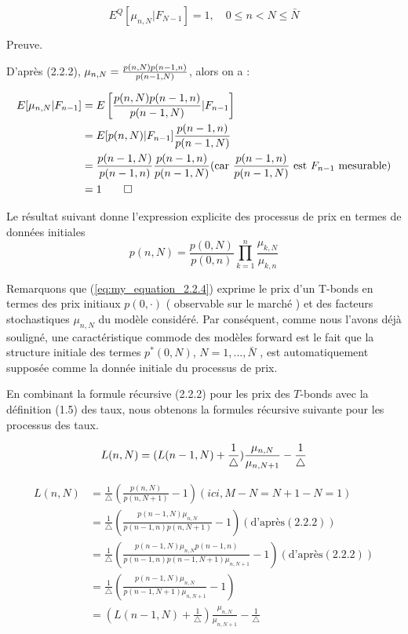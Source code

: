 \begin{equation}
    E^Q[\mu_{n,N}|F_{N-1}] = 1, \quad 0 \leq n < N \leq \bar{N}
    \label{eq:my_equation_2.2.3}
\end{equation}

Preuve.

D'après (2.2.2), $\mu_{n,N}={p(n,N)p(n-1,n) \over p(n-1,N)}$, alors on a :

\begin{align*}
    E[\mu_{n,N} | F_{n-1}] 
    & = E\left[\frac{p(n,N)p(n-1,n)}{p(n-1,N)} | F_{n-1}\right] \\
    & = E[p(n,N) | F_{n-1}] \frac{p(n-1,n)}{p(n-1,N)} \\
    & = \frac{p(n-1,N)}{p(n-1,n)} \frac{p(n-1,n)}{p(n-1,N)} \text{(car} \ {p(n-1,n) \over p(n-1,N)} \ \text{est} \ F_{n-1}\ \text{mesurable)}\\
    & = 1 \tag*{$\Box$}
\end{align*}



Le résultat suivant donne l'expression explicite des processus de prix en termes de données initiales
\begin{equation}
    p(n,N) = \frac{p(0,N)}{p(0,n)} \prod_{k=1}^{n}\frac{\mu_{k,N}}{\mu_{k,n}}
    \label{eq:my_equation_2.2.4}
\end{equation}


Remarquons que (\ref{eq:my_equation_2.2.4}) exprime le prix d'un T-bonds en termes des prix initiaux $p(0,\cdot)$ ( observable sur le marché ) et des facteurs stochastiques $\mu_{n,N}$ du modèle considéré. Par conséquent, comme nous l'avons déjà souligné, une caractéristique commode des modèles forward est le fait que la structure initiale des termes $p^*(0,N)$, $N = 1, . . . , \bar{N}$ , est automatiquement supposée comme la donnée initiale du processus de prix.

En combinant la formule récursive (2.2.2) pour les prix des $T$-bonds avec la définition (1.5) des taux, nous obtenons la formules récursive suivante pour les processus des taux.

$$L(n,N)=(L(n-1,N)+{1 \over \triangle}) {\mu_{n,N} \over \mu_{n,N+1}} - {1 \over \triangle}$$

\begin{align*}
    L(n,N) &= \frac{1}{\triangle} \left( \frac{p(n,N)}{p(n,N+1)} - 1 \right) (ici, M-N=N+1-N=1)\\
    &= \frac{1}{\triangle} \left( \frac{p(n-1,N)\mu_{n,N}}{p(n-1,n)p(n,N+1)} - 1 \right) (\text{d'après} (2.2.2))\\
    &= \frac{1}{\triangle} \left( \frac{p(n-1,N)\mu_{n,N} p(n-1,n)}{p(n-1,n)p(n-1,N+1) \mu_{n,N+1}} - 1 \right) (\text{d'après} (2.2.2))\\
    &= \frac{1}{\triangle} \left( \frac{p(n-1,N)\mu_{n,N}}{p(n-1,N+1)\mu_{n,N+1}} - 1 \right) \\
    &= \left( L(n-1,N) + \frac{1}{\triangle} \right) \frac{\mu_{n,N}}{\mu_{n,N+1}} - \frac{1}{\triangle} \tag*{$\Box$}
\end{align*}



